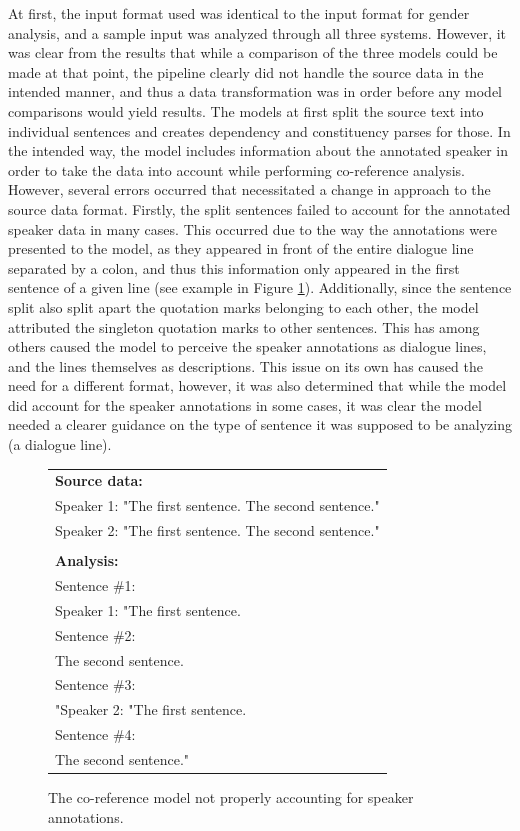 \documentclass[a4paper, 11pt]{article}
\begin{document}
At first, the input format used was identical to the input format for gender analysis, and a sample input was analyzed through all three systems. However, it was clear from the results that while a comparison of the three models could be made at that point, the pipeline clearly did not handle the source data in the intended manner, and thus a data transformation was in order before any model comparisons would yield results. The models at first split the source text into individual sentences and creates dependency and constituency parses for those. In the intended way, the model includes information about the annotated speaker in order to take the data into account while performing co-reference analysis. However, several errors occurred that necessitated a change in approach to the source data format. Firstly, the split sentences failed to account for the annotated speaker data in many cases. This occurred due to the way the annotations were presented to the model, as they appeared in front of the entire dialogue line separated by a colon, and thus this information only appeared in the first sentence of a given line (see example in Figure \ref{fig:badcoref}). Additionally, since the sentence split also split apart the quotation marks belonging to each other, the model attributed the singleton quotation marks to other sentences. This has among others caused the model to perceive the speaker annotations as dialogue lines, and the lines themselves as descriptions. This issue on its own has caused the need for a different format, however, it was also determined that while the model did account for the speaker annotations in some cases, it was clear the model needed a clearer guidance on the type of sentence it was supposed to be analyzing (a dialogue line).

\begin{figure}[h!]
  \centering
  \begin{small}
  \begin{tabular}{l}
  \textbf{Source data:} \\
  Speaker 1: "The first sentence. The second sentence." \\
  Speaker 2: "The first sentence. The second sentence." \\
  \\
  \textbf{Analysis:} \\
  Sentence \#1: \\
  Speaker 1: "The first sentence. \\
  Sentence \#2: \\
  The second sentence. \\
  Sentence \#3: \\
  "Speaker 2: "The first sentence. \\
  Sentence \#4: \\
  The second sentence." \\
  \end{tabular}
  \end{small}
  \caption{The co-reference model not properly accounting for speaker annotations.}
  \label{fig:badcoref}
\end{figure}
\end{document}

